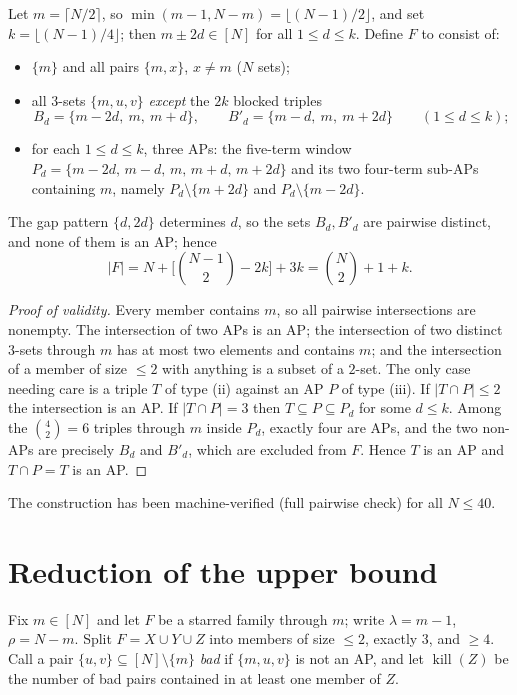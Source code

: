 \documentclass[11pt]{article}
\theoremstyle{definition}
\newcommand{\killop}{\operatorname{kill}}
\begin{document}
Let $m=\lceil N/2\rceil$, so $\min(m-1,N-m)=\lfloor (N-1)/2\rfloor$, and set $k=\lfloor (N-1)/4\rfloor$; then $m\pm 2d\in[N]$ for all $1\le d\le k$. Define $F$ to consist of:
\begin{itemize}
\item[(i)] $\{m\}$ and all pairs $\{m,x\}$, $x\ne m$ \quad ($N$ sets);
\item[(ii)] all $3$-sets $\{m,u,v\}$ \emph{except} the $2k$ blocked triples
\[ B_d=\{m-2d,\ m,\ m+d\},\qquad B'_d=\{m-d,\ m,\ m+2d\}\qquad (1\le d\le k); \]
\item[(iii)] for each $1\le d\le k$, three APs: the five-term window
$P_d=\{m-2d,\,m-d,\,m,\,m+d,\,m+2d\}$
and its two four-term sub-APs containing $m$, namely $P_d\setminus\{m+2d\}$ and $P_d\setminus\{m-2d\}$.
\end{itemize}
The gap pattern $\{d,2d\}$ determines $d$, so the sets $B_d,B'_d$ are pairwise distinct, and none of them is an AP; hence
\[ |F| = N + \Big[\binom{N-1}{2}-2k\Big] + 3k = \binom N2 + 1 + k. \]

\begin{proof}[Proof of validity]
Every member contains $m$, so all pairwise intersections are nonempty. The intersection of two APs is an AP; the intersection of two distinct $3$-sets through $m$ has at most two elements and contains $m$; and the intersection of a member of size $\le 2$ with anything is a subset of a $2$-set. The only case needing care is a triple $T$ of type (ii) against an AP $P$ of type (iii). If $|T\cap P|\le 2$ the intersection is an AP. If $|T\cap P|=3$ then $T\subseteq P\subseteq P_d$ for some $d\le k$. Among the $\binom 42=6$ triples through $m$ inside $P_d$, exactly four are APs, and the two non-APs are precisely $B_d$ and $B'_d$, which are excluded from $F$. Hence $T$ is an AP and $T\cap P=T$ is an AP.
\end{proof}

The construction has been machine-verified (full pairwise check) for all $N\le 40$.

\section{Reduction of the upper bound}\label{sec:reduction}

Fix $m\in[N]$ and let $F$ be a starred family through $m$; write $\lambda=m-1$, $\rho=N-m$. Split $F=X\cup Y\cup Z$ into members of size $\le 2$, exactly $3$, and $\ge 4$. Call a pair $\{u,v\}\subseteq[N]\setminus\{m\}$ \emph{bad} if $\{m,u,v\}$ is not an AP, and let $\killop(Z)$ be the number of bad pairs contained in at least one member of $Z$.
\end{document}
